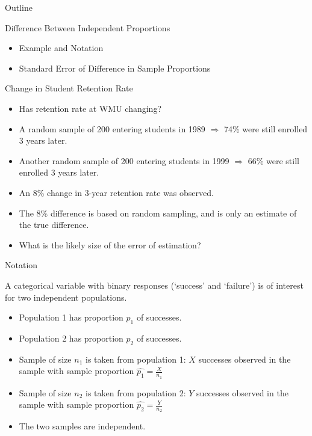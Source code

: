 \documentclass[14pt]{beamer}\usepackage[]{graphicx}\usepackage[]{color}
\begin{document}
\begin{frame}[fragile]{Outline}


Difference Between Independent Proportions  

\begin{itemize}
\item Example and Notation
\item Standard Error of Difference in Sample Proportions
\end{itemize}
\end{frame}

\begin{frame}[fragile]{Change in Student Retention Rate}

\begin{itemize}
\item<1-> Has retention rate at WMU  changing?
\item<2-> A random sample of 200 entering students in 1989 $\Rightarrow$ 74\% were  still enrolled 3 years later.
\item<3-> Another random sample of 200 entering students in 1999 $\Rightarrow$ 66\% were still enrolled 3 years later.
\item<4-> An 8\% change in 3-year retention rate was observed.
\item<5-> The 8\% difference is based on random sampling, and is only an  estimate of the true difference.
\item<6-> What is the likely size of the error of estimation?
\end{itemize}
\end{frame}

\begin{frame}[fragile]{Notation}

A categorical variable with binary responses (`success' and `failure') is of  interest for two independent populations.

\begin{itemize}
\item<1-> Population 1 has proportion $p_1$ of successes.  
\item<2-> Population 2 has proportion $p_2$ of successes.
\item<3-> Sample of size $n_1$  is taken from population 1: $X$ successes observed in the sample with sample proportion $\hat{p_1} = \frac{X}{n_1}$
\item<4-> Sample of size $n_2$  is taken from population 2: $Y$ successes observed in the sample with sample proportion $\hat{p_2} = \frac{Y}{n_2}$
\item<5-> The two samples are independent.
\end{itemize}
\end{frame}
\end{document}
